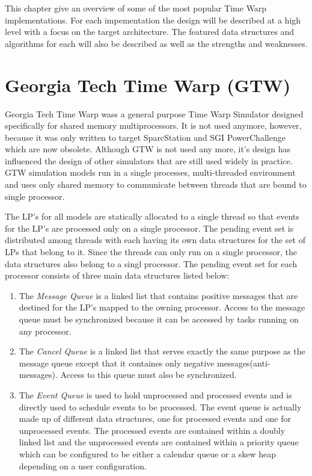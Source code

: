 \documentclass[11pt]{book}
\begin{document}
This chapter give an overview of some of the most popular Time Warp implementations. For each
impementation the design will be described at a high level with a focus on the target
architecture. The featured data structures and algorithms for each will also be described
as well as the strengths and weaknesses.

\section{Georgia Tech Time Warp (GTW)}

Georgia Tech Time Warp wass a general purpose Time Warp Simulator designed specifically for
shared memory multiprocessors. It is not used anymore, however, because it was only written
to target SparcStation and SGI PowerChallenge which are now obsolete. Although GTW is not
used any more, it's design has influenced the design of other simulators that are still used
widely in practice. GTW simulation models run in a single processes, multi-threaded environment
and uses only shared memory to communicate between threads that are bound to single processor.

The LP's for all models are statically allocated to a single thread so that events for the
LP's are processed only on a single processor. The pending event set is distributed among
threads with each having its own data structures for the set of LPs that belong to it.
Since the threads can only run on a single processor, the data structures also belong to a
singl processor. The pending event set for each processor consists of three main data structures
listed below\cite{das-94}:

\begin{enumerate}
    \item The \emph{Message Queue} is a linked list that contains positive messages that
        are destined for the LP's mapped to the owning processor. Access to the message
        queue must be synchronized because it can be accessed by tasks running on any processor.
    \item The \emph{Cancel Queue} is a linked list that serves exactly the same purpose as
        the message queue except that it containes only negative messages(anti-messages).
        Access to this queue must also be synchronized.
    \item The \emph{Event Queue} is used to hold unprocessed and processed events and is
        directly used to schedule events to be processed. The event queue is actually made
        up of different data structures, one for processed events and one for unprocessed
        events. The processed events are contained within a doubly linked list and the
        unprocessed events are contained within a priority queue which can be configured to
        be either a calendar queue or a skew heap depending on a user configuration.
\end{enumerate}
\end{document}
